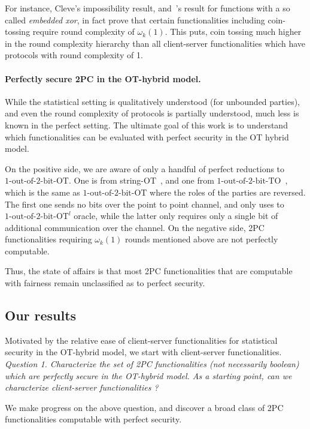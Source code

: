 \documentclass[a4paper]{article}
\newcommand{\OT}[2]{#1\text{-out-of-}#2\text{-bit-OT}}
\newcommand{\TO}[2]{#1\text{-out-of-}#2\text{-bit-TO}}
\begin{document}
For instance, Cleve's impossibility result, and~\cite{GHKL08}'s result for functions with a so called \emph{embedded xor}, in fact prove that certain functionalities including coin-tossing require round complexity of $\omega_k(1)$. This puts, coin tossing much higher in the round complexity hierarchy than all client-server functionalities which have protocols with round complexity of 1.

\paragraph{Perfectly secure 2PC in the OT-hybrid model.}
While the statistical setting is qualitatively understood (for unbounded parties), and even the round complexity of protocols is partially understood, much less is known in the perfect setting. 
The ultimate goal of this work is to understand which functionalities can be evaluated with perfect security in the OT hybrid model.

On the positive side, we are aware of only a handful of perfect reductions to $\OT{1}{2}$. One is from string-OT~\cite{BCS96}, and one from $\TO{1}{2}$~\cite{WolfW06}, which is the same as $\OT{1}{2}$ where the roles of the parties are reversed. The first one sends no bits over the point to point channel, and only uses to ${\OT{1}{2}}^l$ oracle, while the latter only requires only a single bit of additional communication over the channel.
On the negative side, 2PC functionalities requiring $\omega_k(1)$ rounds mentioned above are not perfectly computable. 

Thus, the state of affairs is that most 2PC functionalities that are computable with fairness remain unclassified as to perfect security. 

\subsection{Our results}

Motivated by the relative ease of client-server functionalities for statistical security in the OT-hybrid model, we start with client-server functionalities.\\

\emph{Question 1. Characterize the set of 2PC functionalities (not necessarily boolean) which are perfectly secure in the OT-hybrid model.
As a starting point, can we characterize client-server functionalities ?}
 
We make progress on the above question, and discover a broad class of 2PC functionalities computable with perfect security.
\end{document}
